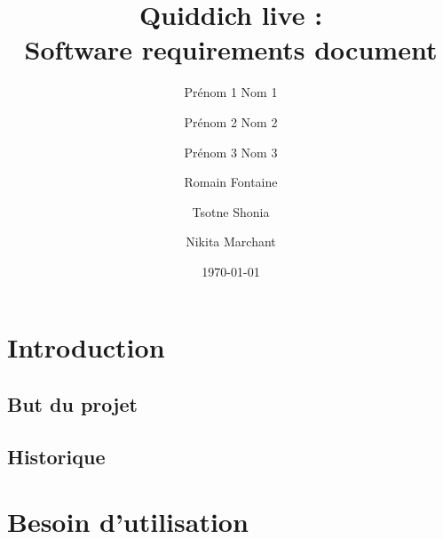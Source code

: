 \documentclass[a4paper]{article}
\title{Quiddich live : \\Software requirements document}
\author{Prénom 1 Nom 1 \and Prénom 2 Nom 2 \and Prénom 3 Nom 3 \and
Romain Fontaine \and Tsotne Shonia \and Nikita Marchant}
\date{\today}
\begin{document}
\maketitle

\section{Introduction}
\subsection{But du projet}

\printglossary[numberedsection]
\subsection{Historique}

\section{Besoin d'utilisation}
\end{document}
